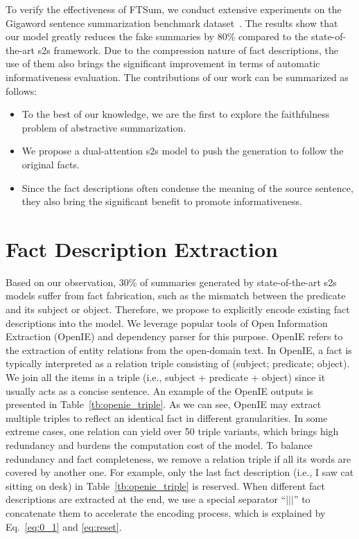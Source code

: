\documentclass[letterpaper]{article} \usepackage{aaai18}  \usepackage{times}  \usepackage{helvet}  \usepackage{courier}  \usepackage{url}  \usepackage{graphicx}  \usepackage{amsfonts}
\begin{document}
	To verify the effectiveness of FTSum, we conduct extensive experiments on the Gigaword sentence summarization benchmark dataset~\cite{rush-chopra-weston:2015:EMNLP}.
	The results show that our model greatly reduces the fake summaries by 80\% compared to the state-of-the-art s2s framework.
	Due to the compression nature of fact descriptions, the use of them also brings the significant improvement in terms of automatic informativeness evaluation. 
The contributions of our work can be summarized as follows:
	\begin{itemize}
		\item To the best of our knowledge, we are the first to explore the faithfulness problem of abstractive summarization.
		\item We propose a dual-attention s2s model to push the generation to follow the original facts.
		\item Since the fact descriptions often condense the meaning of
		the source sentence, they also bring the significant benefit to promote informativeness.
	\end{itemize}
	
	
	\section{Fact Description Extraction}
	Based on our observation, 30\% of summaries generated by state-of-the-art s2s models suffer from fact fabrication, such as the mismatch between the predicate and its subject or object.
	Therefore, we propose to explicitly encode existing fact descriptions into the model.
	We leverage popular tools of Open Information Extraction (OpenIE) and dependency parser for this purpose.
	OpenIE refers to the extraction of entity relations from the open-domain text. 
	In OpenIE, a fact is typically interpreted as a relation triple consisting of (subject; predicate; object).
	We join all the items in a triple (i.e., subject + predicate + object) since it usually acts as a concise sentence.
	An example of the OpenIE outputs is presented in Table~\ref{tb:openie_triple}.
	As we can see,  OpenIE may extract multiple triples to reflect an identical fact in different granularities.
	In some extreme cases, one relation can yield over 50 triple variants, which brings high redundancy and burdens the computation cost of the model.
	To balance redundancy and fact completeness, we remove a relation triple if all its words are covered by another one.
	For example, only the last fact description (i.e., I saw cat sitting on desk) in Table~\ref{tb:openie_triple} is reserved.
	When different fact descriptions are extracted at the end, we use a special separator ``$|||$'' to concatenate them to accelerate the encoding process, which is explained by Eq.~\ref{eq:0_1} and \ref{eq:reset}.
	
\end{document}
